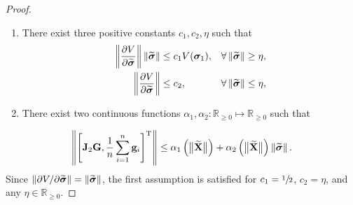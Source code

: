 \begin{proof}
    \begin{enumerate}
        \item There exist three positive constants $c_1, c_2, \eta$ such that
        \begin{align}
            \left\|\frac{\partial V}{\partial \widetilde{\bm{\sigma}}}\right\| \left\|\widetilde{\bm{\sigma}}\right\| &\leq c_1 V(\bm{\sigma}_1), & 
            \forall \left\|\widetilde{\bm{\sigma}}\right\| &\geq \eta, \\
            \left\|\frac{\partial V}{\partial \widetilde{\bm{\sigma}}}\right\| &\leq c_2, &
            \forall \left\|\widetilde{\bm{\sigma}}\right\| &\leq \eta,
        \end{align}
        \item There exist two continuous functions $\alpha_{1}, \alpha_{2} : \mathbb{R}_{\geq 0} \mapsto \mathbb{R}_{\geq 0}$ such that
    \end{enumerate}
    
    \begin{equation}
        \left\|\left[\mathbf{J}_2\mathbf{G}, \frac{1}{n}\sum_{i=1}^n\mathbf{g}_i\right]^{\mathrm{T}}\right\| \leq \alpha_1\left(\bigl\|\widetilde{\mathbf{X}}\bigr\|\right) + \alpha_2\left(\bigl\|\widetilde{\mathbf{X}}\bigr\|\right) \left\|\widetilde{\bm{\sigma}}\right\|.
        \label{eq:NSB_R_USGES_assumption_2}
    \end{equation}
    Since $\left\|\partial V / \partial \widetilde{\bm{\sigma}}\right\| = \left\|\widetilde{\bm{\sigma}}\right\|$, the first assumption is satisfied for $c_1 = \sfrac{1}{2}$, $c_2 = \eta$, and any $\eta \in \mathbb{R}_{\geq 0}$.

    


\end{proof}
